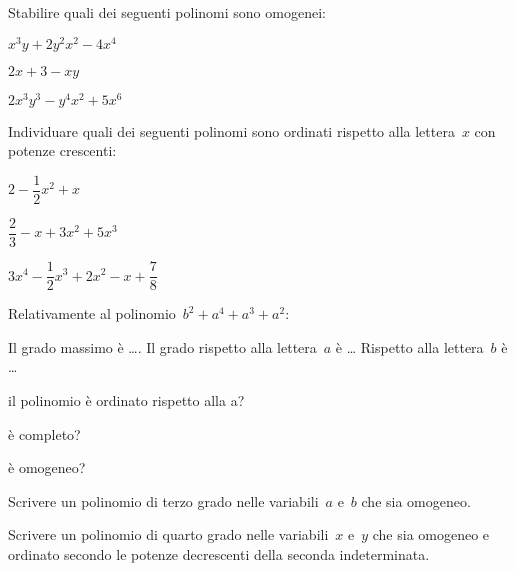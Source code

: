 \begin{multicols}{2}
\begin{esercizio}
\label{ese:10.3}
Stabilire quali dei seguenti polinomi sono omogenei:

\begin{enumeratea}
\item $x^3y+2y^2x^2-4x^4$
\item $2x+3-xy$
\item $2x^3y^3-y^4x^2+5x^6$
\end{enumeratea}
\end{esercizio}

\begin{esercizio}
\label{ese:10.4}
Individuare quali dei seguenti polinomi sono ordinati rispetto alla lettera~$x$ 
con potenze crescenti:

\begin{enumeratea}
\item $2-\dfrac{1}{2}x^2+x$
\item $\dfrac{2}{3}-x+3x^2+5x^3$
\item $3x^4-\dfrac{1}{2}x^3+2x^2-x+\dfrac{7}{8}$
\end{enumeratea}
\end{esercizio}

\begin{esercizio}
\label{ese:10.5}
Relativamente al polinomio~$b^2+a^4+a^3+a^2$:
\begin{itemize*}
\item Il grado massimo è \ldots. Il grado rispetto alla lettera~$a$ è \ldots 
Rispetto alla lettera~$b$ è \ldots
\item il polinomio è ordinato rispetto alla a? %
\item è completo? %
\item è omogeneo? %
\end{itemize*}
\end{esercizio}

\begin{esercizio}
\label{ese:10.6}
Scrivere un polinomio di terzo grado nelle variabili~$a$ e~$b$ che sia omogeneo.
\end{esercizio}

\begin{esercizio}
\label{ese:10.7}
Scrivere un polinomio di quarto grado nelle variabili~$x$ e~$y$ che sia omogeneo 
e ordinato secondo le
potenze decrescenti della seconda indeterminata.
\end{esercizio}


\end{multicols}
